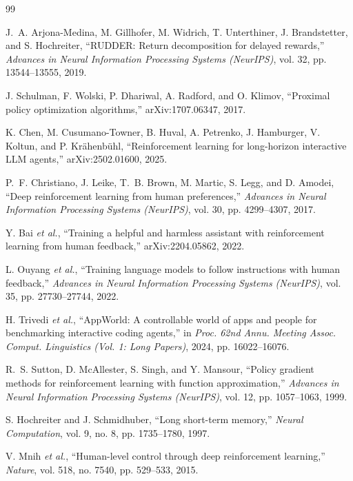 \documentclass[conference]{IEEEtran}
\begin{document}
\begin{thebibliography}{99}

 J.~A. Arjona-Medina, M. Gillhofer, M. Widrich, T. Unterthiner, J. Brandstetter, and S. Hochreiter, ``RUDDER: Return decomposition for delayed rewards,'' \emph{Advances in Neural Information Processing Systems (NeurIPS)}, vol. 32, pp. 13544--13555, 2019.

 J. Schulman, F. Wolski, P. Dhariwal, A. Radford, and O. Klimov, ``Proximal policy optimization algorithms,'' arXiv:1707.06347, 2017.

 K. Chen, M. Cusumano-Towner, B. Huval, A. Petrenko, J. Hamburger, V. Koltun, and P. Kr\"ahenb\"uhl, ``Reinforcement learning for long-horizon interactive LLM agents,'' arXiv:2502.01600, 2025.

 P.~F. Christiano, J. Leike, T.~B. Brown, M. Martic, S. Legg, and D. Amodei, ``Deep reinforcement learning from human preferences,'' \emph{Advances in Neural Information Processing Systems (NeurIPS)}, vol. 30, pp. 4299--4307, 2017.

 Y. Bai \emph{et al.}, ``Training a helpful and harmless assistant with reinforcement learning from human feedback,'' arXiv:2204.05862, 2022.

 L. Ouyang \emph{et al.}, ``Training language models to follow instructions with human feedback,'' \emph{Advances in Neural Information Processing Systems (NeurIPS)}, vol. 35, pp. 27730--27744, 2022.

 H. Trivedi \emph{et al.}, ``AppWorld: A controllable world of apps and people for benchmarking interactive coding agents,'' in \emph{Proc. 62nd Annu. Meeting Assoc. Comput. Linguistics (Vol. 1: Long Papers)}, 2024, pp. 16022--16076.

 R.~S. Sutton, D. McAllester, S. Singh, and Y. Mansour, ``Policy gradient methods for reinforcement learning with function approximation,'' \emph{Advances in Neural Information Processing Systems (NeurIPS)}, vol. 12, pp. 1057--1063, 1999.

 S. Hochreiter and J. Schmidhuber, ``Long short-term memory,'' \emph{Neural Computation}, vol. 9, no. 8, pp. 1735--1780, 1997.

 V. Mnih \emph{et al.}, ``Human-level control through deep reinforcement learning,'' \emph{Nature}, vol. 518, no. 7540, pp. 529--533, 2015.


\end{thebibliography}
\end{document}
